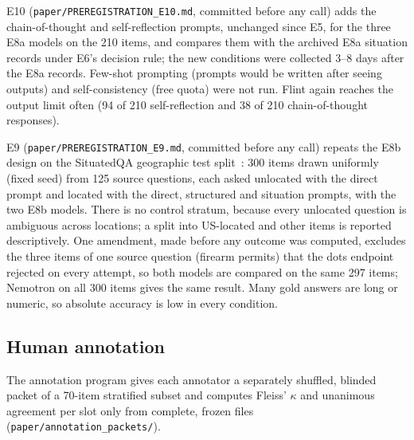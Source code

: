 E10 (\texttt{paper/PREREGISTRATION\_E10.md}, committed before any call) adds the
chain-of-thought and self-reflection prompts, unchanged since E5, for the three
E8a models on the 210 items, and compares them with the archived E8a situation
records under E6's decision rule; the new conditions were collected 3--8 days
after the E8a records. Few-shot prompting (prompts would be written after seeing
outputs) and self-consistency (free quota) were not run. Flint again reaches the output limit often
(94 of 210 self-reflection and 38 of 210 chain-of-thought responses).

E9 (\texttt{paper/PREREGISTRATION\_E9.md}, committed before any call) repeats the
E8b design on the SituatedQA geographic test split~\cite{zhang2021situatedqa}: 300
items drawn uniformly (fixed seed) from 125 source questions, each asked unlocated
with the direct prompt and located with the direct, structured and situation
prompts, with the two E8b models. There is no control stratum, because every
unlocated question is ambiguous across locations; a split into US-located and other
items is reported descriptively. One amendment, made before any outcome was
computed, excludes the three items of one source question (firearm permits) that
the dots endpoint rejected on every attempt, so both models are compared on the
same 297 items; Nemotron on all 300 items gives the same result. Many gold answers
are long or numeric, so absolute accuracy is low in every condition.

\subsection*{Human annotation}

The annotation program gives each annotator a separately shuffled, blinded
packet of a 70-item stratified subset and computes Fleiss' $\kappa$ and
unanimous agreement per slot only from complete, frozen files
(\texttt{paper/annotation\_packets/}).

